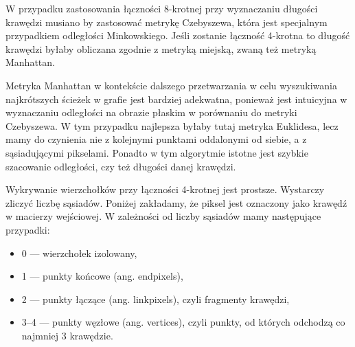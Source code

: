 \documentclass[a4paper,11pt,twoside,openright]{report}
\theoremstyle{definition}
\begin{document}
W przypadku zastosowania łączności 8-krotnej przy wyznaczaniu długości krawędzi musiano by zastosować metrykę Czebyszewa, która jest specjalnym przypadkiem odległości Minkowskiego. Jeśli zostanie łączność 4-krotna to długość krawędzi byłaby obliczana zgodnie z metryką miejską, zwaną też metryką Manhattan.

Metryka Manhattan w kontekście dalszego przetwarzania w celu wyszukiwania najkrótszych ścieżek w grafie jest bardziej adekwatna, ponieważ jest intuicyjna w wyznaczaniu odległości na obrazie płaskim w porównaniu do metryki Czebyszewa. W tym przypadku najlepsza byłaby tutaj metryka Euklidesa, lecz mamy do czynienia nie z kolejnymi punktami oddalonymi od siebie, a z sąsiadującymi pikselami. Ponadto w tym algorytmie istotne jest szybkie szacowanie odległości, czy też długości danej krawędzi.

Wykrywanie wierzchołków przy łączności 4-krotnej jest prostsze. Wystarczy zliczyć liczbę sąsiadów. Poniżej zakładamy, że piksel jest oznaczony jako krawędź w macierzy wejściowej. W zależności od liczby sąsiadów mamy następujące przypadki:
\begin{itemize}[noitemsep]
\item 0 --- wierzchołek izolowany,
\item 1 --- punkty końcowe (ang. endpixels),
\item 2 --- punkty łączące (ang. linkpixels), czyli fragmenty krawędzi,
\item 3--4 --- punkty węzłowe (ang. vertices), czyli punkty, od których odchodzą co najmniej 3 krawędzie.
\end{itemize}
\end{document}
